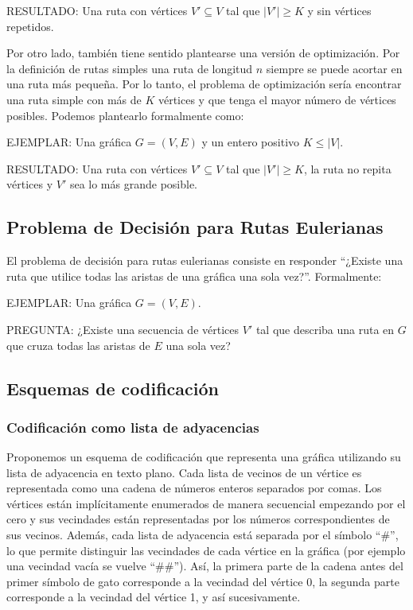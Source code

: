 \documentclass[11pt]{article}
\begin{document}
RESULTADO: Una ruta con vértices $V' \subseteq V$ tal que $|V'| \geq K$ y sin
vértices repetidos.

Por otro lado, también tiene sentido plantearse una versión de optimización. Por
la definición de rutas simples una ruta de longitud $n$ siempre se puede acortar
en una ruta más pequeña. Por lo tanto, el problema de optimización sería
encontrar una ruta simple con más de $K$ vértices y que tenga el mayor número de
vértices posibles. Podemos plantearlo formalmente como:

EJEMPLAR: Una gráfica $G = (V, E)$ y un entero positivo $K \leq |V|$.

RESULTADO: Una ruta con vértices $V' \subseteq V$ tal que $|V'| \geq K$, la ruta
no repita vértices y $V'$ sea lo más grande posible.

\subsection*{Problema de Decisión para Rutas Eulerianas}
El problema de decisión para rutas eulerianas consiste en responder ``¿Existe una
ruta que utilice todas las aristas de una gráfica una sola vez?''. Formalmente:

EJEMPLAR: Una gráfica $G = (V, E)$.

PREGUNTA: ¿Existe una secuencia de vértices $V'$ tal que describa una ruta en
$G$ que cruza todas las aristas de $E$ una sola vez?

\subsection*{Esquemas de codificación}
\subsubsection*{Codificación como lista de adyacencias}
Proponemos un esquema de codificación que representa una gráfica utilizando su
lista de adyacencia en texto plano. Cada lista de vecinos de un vértice es
representada como una cadena de números enteros separados por comas. Los
vértices están implícitamente enumerados de manera secuencial empezando por el
cero y sus vecindades están representadas por los números correspondientes de
sus vecinos. Además, cada lista de adyacencia está separada por el símbolo
``\#'', lo que permite distinguir las vecindades de cada vértice en la gráfica
(por ejemplo una vecindad vacía se vuelve ``\#\#''). Así, la primera parte de la
cadena antes del primer símbolo de gato corresponde a la vecindad del vértice 0,
la segunda parte corresponde a la vecindad del vértice 1, y así sucesivamente.
\end{document}
